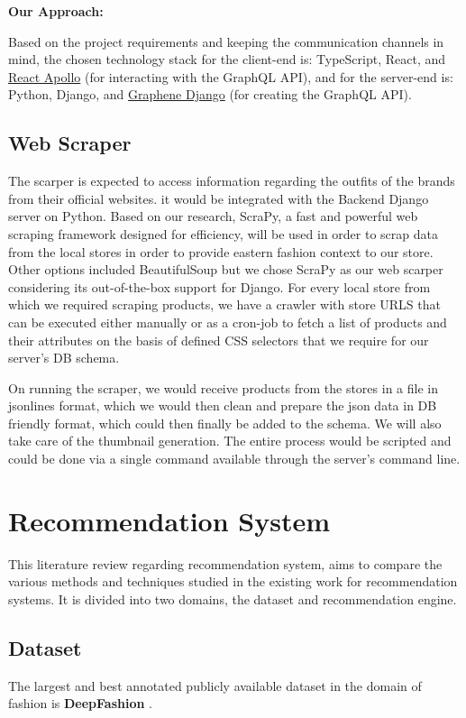 \noindent\textbf{Our Approach:} 

\noindent Based on the project requirements and keeping the communication channels in mind, the chosen technology stack for the client-end is: TypeScript, React, and \href{https://github.com/apollographql/react-apollo}{React Apollo} (for interacting with the GraphQL API), and for the server-end is: Python, Django, and \href{https://github.com/graphql-python/graphene-django}{Graphene Django} (for creating the GraphQL API).

\subsection{Web Scraper}
The scarper is expected to access information regarding the outfits of the brands from their official websites. it would be integrated with the Backend Django server on Python. Based on our research, ScraPy, a fast and powerful web scraping framework designed for efficiency, will be used in order to scrap data from the local stores in order to provide eastern fashion context to our store. Other options included BeautifulSoup but we chose ScraPy as our web scarper considering its out-of-the-box support for Django. For every local store from which we required scraping products, we have a crawler with store URLS that can be executed either manually or as a cron-job to fetch a list of products and their attributes on the basis of defined CSS selectors that we require for our server’s DB schema. 

On running the scraper, we would receive products from the stores in a file in jsonlines format, which we would then clean and prepare the json data in DB friendly format, which could then finally be added to the schema. We will also take care of the thumbnail generation. The entire process would be scripted and could be done via a single command available through the server’s command line. 


\section{Recommendation System}
This literature review regarding recommendation system, aims to compare the various methods and techniques studied in the existing work for recommendation systems. It is divided into two domains, the dataset and recommendation engine.

\subsection{Dataset}
The largest and best annotated publicly available dataset in the domain of fashion is \textbf{DeepFashion} \cite{deepfashion}.

